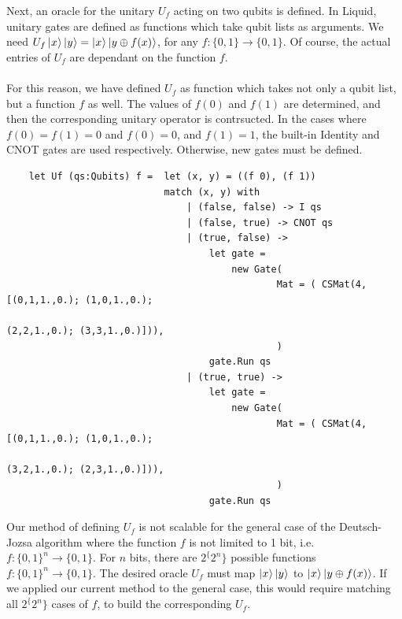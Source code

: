 \documentclass{article}
\theoremstyle{plain}
\theoremstyle{definition}
\theoremstyle{remark}
\begin{document}
\pagebreak

Next, an oracle for the unitary $U_f$ acting on two qubits is defined. In Liquid, unitary gates
are defined as functions which take qubit lists as arguments. We need $U_f \left|\mspace{0.5mu} x \mspace{0.5mu}\right\rangle\left|\mspace{0.5mu} y \mspace{0.5mu}\right\rangle
= \left|\mspace{0.5mu} x \mspace{0.5mu}\right\rangle\left|\mspace{0.5mu} y \oplus f(x) \mspace{0.5mu}\right\rangle$, for any $f : \{0,1\} \rightarrow \{0,1\}$. Of course, the actual entries of $U_f$ are dependant on the
function $f$. \\ \\
For this reason, we have defined $U_f$ as function which takes not only a qubit list, but a function $f$ as well.
The values of $f(0)$ and $f(1)$ are determined, and then the corresponding unitary operator is contrsucted. In the cases
where $f(0) = f(1) = 0$ and $f(0) = 0$, and $f(1) = 1$, the built-in Identity and CNOT gates are used respectively.
Otherwise, new gates must be defined.

\begin{lstlisting}
    let Uf (qs:Qubits) f =  let (x, y) = ((f 0), (f 1))
                            match (x, y) with
                                | (false, false) -> I qs
                                | (false, true) -> CNOT qs
                                | (true, false) ->
                                    let gate =
                                        new Gate(
                                                Mat = ( CSMat(4, [(0,1,1.,0.); (1,0,1.,0.);
                                                                (2,2,1.,0.); (3,3,1.,0.)])),
                                                )
                                    gate.Run qs
                                | (true, true) ->
                                    let gate =
                                        new Gate(
                                                Mat = ( CSMat(4, [(0,1,1.,0.); (1,0,1.,0.);
                                                                (3,2,1.,0.); (2,3,1.,0.)])),
                                                )
                                    gate.Run qs
\end{lstlisting}

Our method of defining $U_f$ is not scalable for the general case of the Deutsch-Jozsa algorithm where the
function $f$ is not limited to 1 bit, i.e. $f: \{0,1\}^n \rightarrow \{0,1\}$. For $n$ bits,
there are $2^\{2^n\}$ possible functions $f: \{0,1\}^n \rightarrow \{0,1\}$.
The desired oracle $U_f$ must map $\left|\mspace{0.5mu} x \mspace{0.5mu}\right\rangle\left|\mspace{0.5mu} y \mspace{0.5mu}\right\rangle$ to $\left|\mspace{0.5mu} x \mspace{0.5mu}\right\rangle\left|\mspace{0.5mu} y \oplus f(x) \mspace{0.5mu}\right\rangle$. If we applied
our current method to the general case, this would require matching all $2^\{2^n\}$ cases of $f$,
to build the corresponding $U_f$. \\
\end{document}
